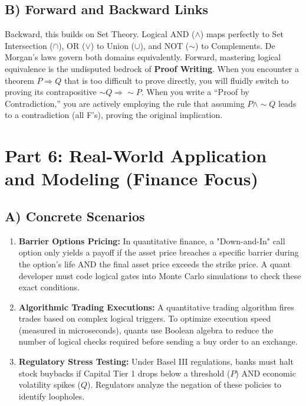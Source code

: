 \documentclass{article}
\begin{document}
\subsection*{B) Forward and Backward Links}
Backward, this builds on Set Theory. Logical AND ($\land$) maps perfectly to Set Intersection ($\cap$), OR ($\lor$) to Union ($\cup$), and NOT ($\sim$) to Complements. De Morgan's laws govern both domains equivalently.
Forward, mastering logical equivalence is the undisputed bedrock of \textbf{Proof Writing}. When you encounter a theorem $P \Rightarrow Q$ that is too difficult to prove directly, you will fluidly switch to proving its contrapositive $\sim Q \Rightarrow \sim P$. When you write a ``Proof by Contradiction,'' you are actively employing the rule that assuming $P \land \sim Q$ leads to a contradiction (all F's), proving the original implication.

\newpage
\section*{Part 6: Real-World Application and Modeling (Finance Focus)}

\subsection*{A) Concrete Scenarios}
\begin{enumerate}
    \item \textbf{Barrier Options Pricing:} In quantitative finance, a "Down-and-In" call option only yields a payoff if the asset price breaches a specific barrier during the option's life AND the final asset price exceeds the strike price. A quant developer must code logical gates into Monte Carlo simulations to check these exact conditions.
    \item \textbf{Algorithmic Trading Executions:} A quantitative trading algorithm fires trades based on complex logical triggers. To optimize execution speed (measured in microseconds), quants use Boolean algebra to reduce the number of logical checks required before sending a buy order to an exchange.
    \item \textbf{Regulatory Stress Testing:} Under Basel III regulations, banks must halt stock buybacks if Capital Tier 1 drops below a threshold ($P$) AND economic volatility spikes ($Q$). Regulators analyze the negation of these policies to identify loopholes.
\end{enumerate}
\end{document}

